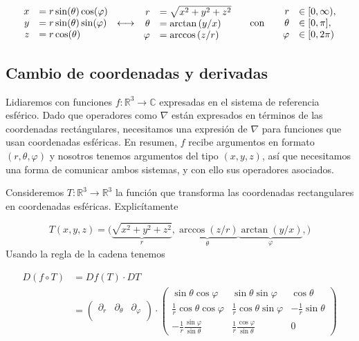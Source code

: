 \documentclass[11pt]{article}
\numberwithin{equation}{section}
\def\R{\mathbb{R}}
\def\C{\mathbb{C}}
\begin{document}
\begin{equation}
\begin{array}{rl}
	x &= r \sin(\theta) \cos(\varphi) \\
	y &= r \sin(\theta) \sin(\varphi) \\
	z &= r \cos(\theta)
\end{array}
\,\longleftrightarrow\,
\begin{array}{rl}
	r       &= \sqrt{x^2 + y^2 + z^2}\\
	\theta  &= \arctan \left(y/x\right)\\
	\varphi &= \arccos \left(z/r\right)
\end{array}
\hspace{.5cm}\text{con}\hspace{.5cm}
\begin{array}{rl}
	r &\in [0,\infty),\\
	\theta &\in [0,\pi],\\
	\varphi &\in [0, 2\pi)
\end{array}
\end{equation}
\subsection{Cambio de coordenadas y derivadas}%
\label{ap:esfericas:nabla}

Lidiaremos con funciones \(f\colon \R^3 \to \C\) expresadas
en el sistema de referencia esférico. Dado que operadores como \(\nabla\) están
expresados en términos de las coordenadas rectángulares, necesitamos una
expresión de \(\nabla\) para funciones que usan coordenadas esféricas. En
resumen, \(f\) recibe argumentos en formato \((r,\theta,\varphi)\) y nosotros
tenemos argumentos del tipo \((x,y,z)\), así que necesitamos una forma de
comunicar ambos sistemas, y con ello sus operadores asociados.

Consideremos \(T\colon \R^3 \to \R^3\) la función que transforma
las coordenadas rectangulares en coordenadas esféricas. Explicítamente

\begin{equation}
	T(x,y,z)
	=
	\big(
		\underbrace{\sqrt{x^2+y^2+z^2}}_{r},
		\underbrace{\arccos(z/r)}_{\theta}
		\underbrace{\arctan(y/x)}_{\varphi},
	\big)
\end{equation}
Usando la regla de la cadena tenemos

\begin{align*}
	D(f\circ T)
	&=
	Df(T)\cdot DT
	\\&=
	\begin{pmatrix}
	\partial_{r} & \partial_{\theta} & \partial_{\varphi}\\
	\end{pmatrix}
	\cdot
	\begin{pmatrix}
	\sin\theta\cos\varphi &
	\sin\theta\sin\varphi &
	\cos\theta
	\\
	\frac{1}{r} \cos\theta\cos\varphi &
	\frac{1}{r} \cos\theta\sin\varphi &
	-\frac{1}{r} \sin\theta
	\\
	-\frac{1}{r} \frac{\sin\varphi}{\sin\theta} &
	\frac{1}{r} \frac{\cos\varphi}{\sin\theta} &
	0
	\end{pmatrix}
\end{align*}
\end{document}
